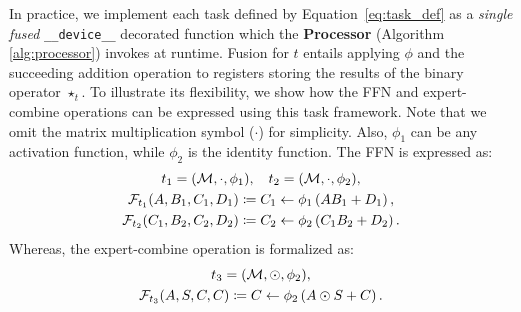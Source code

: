 In practice, we implement each task defined by Equation~\ref{eq:task_def} as a \emph{single fused} \verb|__device__|
decorated function which the \textbf{Processor} (Algorithm \ref{alg:processor}) invokes at runtime.
Fusion for $t$ entails applying $\phi$ and the succeeding addition operation to registers
storing the results of the binary operator $\star_t$.
To illustrate its flexibility, we show how the FFN and expert-combine operations can be expressed
using this task framework.
Note that we omit the matrix multiplication symbol ($\cdot$) for simplicity.
Also, $\phi_1$ can be any activation function, while $\phi_2$ is the identity function.
The FFN is expressed as:
\begin{gather*}\small
    t_1 = (\mathcal{M}, \cdot, \phi_1), \quad t_2 = (\mathcal{M}, \cdot, \phi_2), \\ \small
    \mathcal{F}_{t_1}(A, B_1, C_1, D_1) \coloneqq C_1 \gets \phi_1\left(A B_1 + D_1\right), \\ \small
    \mathcal{F}_{t_2}(C_1, B_2, C_2, D_2) \coloneqq C_2 \gets \phi_2\left(C_1 B_2 + D_2\right).
\end{gather*}
Whereas, the expert-combine operation is formalized as:
\begin{gather*}\small
    t_3 = (\mathcal{M}, \odot, \phi_2), \\ \small
    \mathcal{F}_{t_3}(A, S, C, C) \coloneqq C \gets \phi_2\left(A \odot S + C\right).
\end{gather*}
